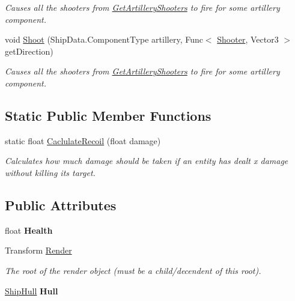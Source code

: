 \begin{DoxyCompactItemize}
\begin{DoxyCompactList}\small\item\em Causes all the shooters from \hyperlink{class_skyrates_1_1_entity_1_1_entity_ship_a75c4b113dd48dba91c0abaaa1372ed1a}{Get\-Artillery\-Shooters} to fire for some artillery component. \end{DoxyCompactList}\item 
void \hyperlink{class_skyrates_1_1_entity_1_1_entity_ship_afab23985ad58abc0ddb2f2ccebe32e0f}{Shoot} (Ship\-Data.\-Component\-Type artillery, Func$<$ \hyperlink{class_skyrates_1_1_mono_1_1_shooter}{Shooter}, Vector3 $>$ get\-Direction)
\begin{DoxyCompactList}\small\item\em Causes all the shooters from \hyperlink{class_skyrates_1_1_entity_1_1_entity_ship_a75c4b113dd48dba91c0abaaa1372ed1a}{Get\-Artillery\-Shooters} to fire for some artillery component. \end{DoxyCompactList}\end{DoxyCompactItemize}
\subsection*{Static Public Member Functions}
\begin{DoxyCompactItemize}
\item 
static float \hyperlink{class_skyrates_1_1_entity_1_1_entity_ship_a94df69121e4413a10add5c11b9bdc63b}{Caclulate\-Recoil} (float damage)
\begin{DoxyCompactList}\small\item\em Calculates how much damage should be taken if an entity has dealt x damage without killing its target. \end{DoxyCompactList}\end{DoxyCompactItemize}
\subsection*{Public Attributes}
\begin{DoxyCompactItemize}
\item 
\hypertarget{class_skyrates_1_1_entity_1_1_entity_ship_a79bcf33d8d4eec87613cecb746cceba9}{float {\bfseries Health}}\label{class_skyrates_1_1_entity_1_1_entity_ship_a79bcf33d8d4eec87613cecb746cceba9}

\item 
Transform \hyperlink{class_skyrates_1_1_entity_1_1_entity_ship_ac8dafb0de0a71b2a0094d639385af28c}{Render}
\begin{DoxyCompactList}\small\item\em The root of the render object (must be a child/decendent of this root). \end{DoxyCompactList}\item 
\hypertarget{class_skyrates_1_1_entity_1_1_entity_ship_a2f51952561caa8b82a47294311474ccb}{\hyperlink{class_skyrates_1_1_ship_1_1_ship_hull}{Ship\-Hull} {\bfseries Hull}}\label{class_skyrates_1_1_entity_1_1_entity_ship_a2f51952561caa8b82a47294311474ccb}

\end{DoxyCompactItemize}
